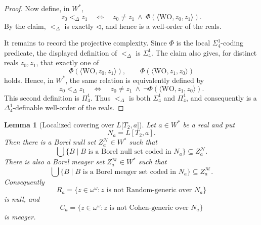 \documentclass[a4paper,11pt]{article}
\newtheorem{lemma}[theorem]{Lemma}
\begin{document}
\begin{proof}
Now define, in \(W^\ast\),
\[
   z_0<_{\Delta}z_1
   \quad\Longleftrightarrow\quad
   z_0\ne z_1\ \land\
   \Phi(\langle\mathrm{WO},z_0,z_1\rangle).
\]
By the claim, \(<_{\Delta}\) is exactly \(\triangleleft\), and hence is a well-order of the reals.

It remains to record the projective complexity.  Since \(\Phi\) is the local \(\Sigma^1_4\)-coding predicate, the displayed definition of \(<_{\Delta}\) is \(\Sigma^1_4\).  The claim also gives, for distinct reals \(z_0,z_1\), that exactly one of
\[
   \Phi(\langle\mathrm{WO},z_0,z_1\rangle),
   \qquad
   \Phi(\langle\mathrm{WO},z_1,z_0\rangle)
\]
holds.  Hence, in \(W^\ast\), the same relation is equivalently defined by
\[
   z_0<_{\Delta}z_1
   \quad\Longleftrightarrow\quad
   z_0\ne z_1\ \land\
   \neg\Phi(\langle\mathrm{WO},z_1,z_0\rangle).
\]
This second definition is \(\Pi^1_4\).  Thus \(<_{\Delta}\) is both \(\Sigma^1_4\) and \(\Pi^1_4\), and consequently is a \(\Delta^1_4\)-definable well-order of the reals.
\end{proof}




\begin{lemma}[Localized covering over $L\lbrack T_2,a\rbrack$]\label{lem:random-cohen-covering-final}
Let $a\in W^\ast$ be a real and put
\[
   N_a=L[T_2,a].
\]
Then there is a Borel null set $Z_a^{\mathcal N}\in W^\ast$ such that
\[
   \bigcup\{B\mid B\text{ is a Borel null set coded in }N_a\}
   \subseteq Z_a^{\mathcal N}.
\]
There is also a Borel meager set $Z_a^{\mathcal M}\in W^\ast$ such that
\[
   \bigcup\{B\mid B\text{ is a Borel meager set coded in }N_a\}
   \subseteq Z_a^{\mathcal M}.
\]
Consequently
\[
   R_a=\{z\in\omega^\omega:z\text{ is not Random-generic over }N_a\}
\]
is null, and
\[
   C_a=\{z\in\omega^\omega:z\text{ is not Cohen-generic over }N_a\}
\]
is meager.
\end{lemma}
\end{document}
